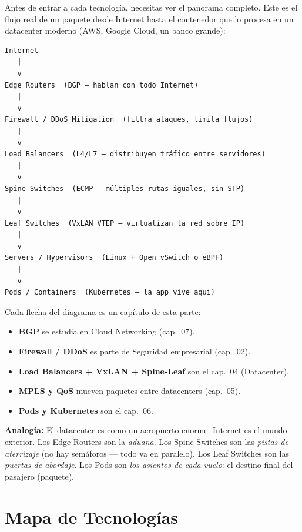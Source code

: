 Antes de entrar a cada tecnología, necesitas ver el panorama completo.
Este es el flujo real de un paquete desde Internet hasta el contenedor
que lo procesa en un datacenter moderno (AWS, Google Cloud, un banco grande):

\begin{center}
\begin{lstlisting}
Internet
   |
   v
Edge Routers  (BGP — hablan con todo Internet)
   |
   v
Firewall / DDoS Mitigation  (filtra ataques, limita flujos)
   |
   v
Load Balancers  (L4/L7 — distribuyen tráfico entre servidores)
   |
   v
Spine Switches  (ECMP — múltiples rutas iguales, sin STP)
   |
   v
Leaf Switches  (VxLAN VTEP — virtualizan la red sobre IP)
   |
   v
Servers / Hypervisors  (Linux + Open vSwitch o eBPF)
   |
   v
Pods / Containers  (Kubernetes — la app vive aquí)
\end{lstlisting}
\end{center}

\begin{concepto}
Cada flecha del diagrama es un capítulo de esta parte:

\begin{itemize}
    \item \textbf{BGP} se estudia en Cloud Networking (cap.\ 07).
    \item \textbf{Firewall / DDoS} es parte de Seguridad empresarial (cap.\ 02).
    \item \textbf{Load Balancers + VxLAN + Spine-Leaf} son el cap.\ 04 (Datacenter).
    \item \textbf{MPLS y QoS} mueven paquetes entre datacenters (cap.\ 05).
    \item \textbf{Pods y Kubernetes} son el cap.\ 06.
\end{itemize}

 \textbf{Analogía:}
El datacenter es como un aeropuerto enorme. Internet es el mundo exterior.
Los Edge Routers son la \textit{aduana}. Los Spine Switches son las
\textit{pistas de aterrizaje} (no hay semáforos --- todo va en paralelo).
Los Leaf Switches son las \textit{puertas de abordaje}. Los Pods son
\textit{los asientos de cada vuelo}: el destino final del pasajero (paquete).
\end{concepto}

\section{ Mapa de Tecnologías}

